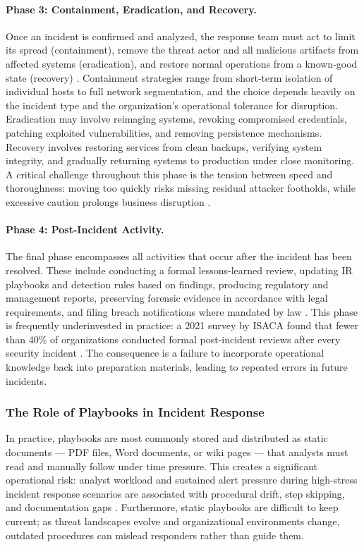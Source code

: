 \paragraph{Phase 3: Containment, Eradication, and Recovery.}
Once an incident is confirmed and analyzed, the response team must act to limit its spread (containment), remove the threat actor and all malicious artifacts from affected systems (eradication), and restore normal operations from a known-good state (recovery) \citep{nist2025}.
Containment strategies range from short-term isolation of individual hosts to full network segmentation, and the choice depends heavily on the incident type and the organization's operational tolerance for disruption.
Eradication may involve reimaging systems, revoking compromised credentials, patching exploited vulnerabilities, and removing persistence mechanisms.
Recovery involves restoring services from clean backups, verifying system integrity, and gradually returning systems to production under close monitoring.
A critical challenge throughout this phase is the tension between speed and thoroughness: moving too quickly risks missing residual attacker footholds, while excessive caution prolongs business disruption \citep{sans2021}.

\paragraph{Phase 4: Post-Incident Activity.}
The final phase encompasses all activities that occur after the incident has been resolved.
These include conducting a formal lessons-learned review, updating IR playbooks and detection rules based on findings, producing regulatory and management reports, preserving forensic evidence in accordance with legal requirements, and filing breach notifications where mandated by law \citep{nist2025}.
This phase is frequently underinvested in practice: a 2021 survey by ISACA found that fewer than 40\% of organizations conducted formal post-incident reviews after every security incident \citep{isaca2021}.
The consequence is a failure to incorporate operational knowledge back into preparation materials, leading to repeated errors in future incidents.

\subsubsection{The Role of Playbooks in Incident Response}

In practice, playbooks are most commonly stored and distributed as static documents --- PDF files, Word documents, or wiki pages --- that analysts must read and manually follow under time pressure.
This creates a significant operational risk: analyst workload and sustained alert pressure during high-stress incident response scenarios are associated with procedural drift, step skipping, and documentation gaps \citep{ponemon2022}.
Furthermore, static playbooks are difficult to keep current; as threat landscapes evolve and organizational environments change, outdated procedures can mislead responders rather than guide them.


